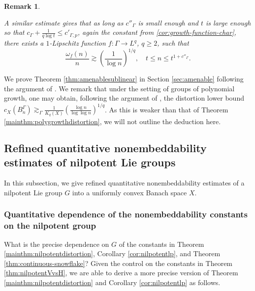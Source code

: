 \documentclass[11pt,reqno]{amsart}
\newtheorem{remark}[theorem]{Remark}
\newcommand{\1}{\mathbf 1}
\begin{document}
\begin{remark}
\begin{enumerate}
A similar estimate gives that as long as $c''_\Gamma$ is small enough and $t$ is large enough so that $c_\Gamma+\frac{1}{q\log t}\le c'_{\Gamma,p}$, again the constant from \ref{cor:growth-function-char}, there exists a $1$-Lipschitz function $f:\Gamma\to L^q$, $q\ge 2$, such that
    \[
\frac{\omega_f\left(n\right)}{n}\gtrsim \left(\frac{1}{\log n}\right)^{1/q},\quad t\le n\le t^{1+c''_\Gamma}.
\]
\end{enumerate}
\end{remark}
We prove Theorem \ref{thm:amenablesublinear} in Section \ref{sec:amenable} following the argument of \cite{austin2013sharp}. We remark that under the setting of groups of polynomial growth, one may obtain, following the argument of \cite[Section 6]{austin2013sharp}, the distortion lower bound $c_X\left(B^\Gamma_n\right)\gtrsim_\Gamma \frac{1}{K_q\left(X\right)} \left(\frac{\log n}{\log\log n}\right)^{1/q}$. As this is weaker than that of Theorem \ref{mainthm:polygrowthdistortion}, we will not outline the deduction here.

\subsection{Refined quantitative nonembeddability estimates of nilpotent Lie groups}\label{subsec:net}
In this subsection, we give refined quantitative nonembeddability estimates of a nilpotent Lie group $G$ into a uniformly convex Banach space $X$.
\subsubsection{Quantitative dependence of the nonembeddability constants on the nilpotent group}\label{subsubsec:quant}
What is the precise dependence on $G$ of the constants in Theorem \ref{mainthm:nilpotentdistortion}, Corollary \ref{cor:nilpotentlp}, and Theorem \ref{thm:continuous-snowflake}? Given the control on the constants in Theorem \ref{thm:nilpotentVvsH}, we are able to derive a more precise version of Theorem \ref{mainthm:nilpotentdistortion} and Corollary \ref{cor:nilpotentlp} as follows.
\end{document}
